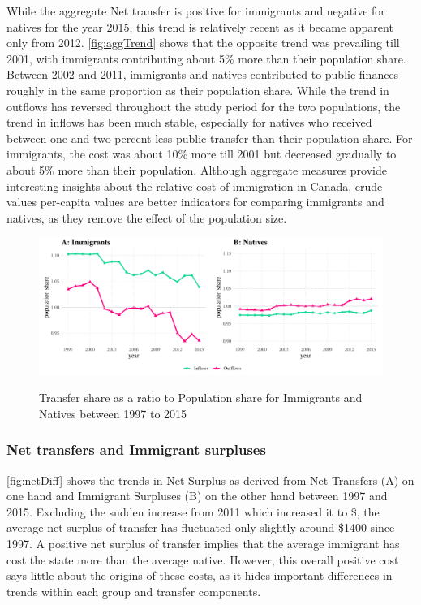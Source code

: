   While the aggregate Net transfer is positive for immigrants and negative for natives for the year 2015, this trend is relatively recent as it became apparent only from 2012.
\autoref{fig:aggTrend} shows that the opposite trend was prevailing till 2001, with immigrants contributing about 5\% more than their population share.
Between 2002 and 2011, immigrants and natives contributed to public finances roughly in the same proportion as their population share.
While the trend in outflows has reversed throughout the study period for the two populations, the trend in inflows has been much stable, especially for natives who received between one and two percent less public transfer than their population share.
For immigrants, the cost was about 10\% more till 2001 but decreased gradually to about 5\% more than their population.
Although aggregate measures provide interesting insights about the relative cost of immigration in Canada, crude values per-capita values are better indicators for comparing immigrants and natives, as they remove the effect of the population size.

  \begin{figure}[H]%
    \caption{Transfer share as a ratio to Population share for Immigrants and Natives between 1997 to 2015}
    \includegraphics[width=1\textwidth]{res/aggTrend.pdf}%
    \label{fig:aggTrend}%
  \end{figure}%

  \subsubsection*{Net transfers and Immigrant surpluses}

\autoref{fig:netDiff} shows the trends in Net Surplus as derived from Net Transfers (A) on one hand and Immigrant Surpluses (B) on the other hand between 1997 and 2015.
Excluding the sudden increase from 2011 which increased it to \$, the average net surplus of transfer has fluctuated only slightly around \$1400 since 1997.
A positive net surplus of transfer implies that the average immigrant has cost the state more than the average native.
However, this overall positive cost says little about the origins of these costs, as it hides important differences in trends within each group and transfer components.

